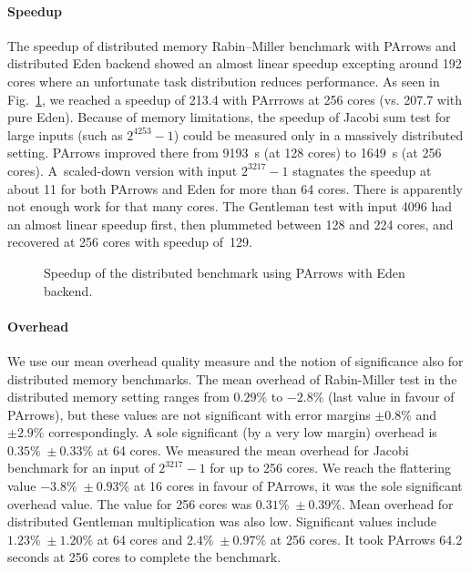 \paragraph{Speedup}
The speedup of distributed memory Rabin--Miller benchmark with PArrows and distributed Eden backend showed an almost 
linear speedup excepting around 192 cores where an unfortunate task distribution reduces performance.
As seen in Fig.~\ref{fig:rabinMillerDistSpeedup}, we reached a speedup of 213.4 with PArrrows at 256 cores (vs. 207.7 with pure Eden). Because of memory limitations, the speedup of Jacobi sum test for large inputs (such as $2^{4253}-1$) could be measured only in a massively distributed setting. PArrows improved there from \SI{9193}{\second} (at 128 cores) to \SI{1649}{\second} (at 256 cores). A~scaled-down version with input $2^{3217}-1$ stagnates the speedup at about 11 for both PArrows and Eden for more than 64 cores. There is apparently not enough work for that many cores. The Gentleman test with input 4096 had an almost linear speedup first, then plummeted between 128 and 224 cores, and recovered at 256 cores with speedup of~129.

\begin{figure}[ht]
	\centering
	\caption[Speedup distributed Rabin--Miller]{Speedup of the distributed \rmtest benchmark using PArrows with Eden backend.}
	\label{fig:rabinMillerDistSpeedup}
\end{figure}

\paragraph{Overhead}
We use our mean overhead quality measure and the notion of significance also for distributed memory benchmarks. The mean overhead of Rabin-Miller test in the distributed memory setting ranges from $0.29\%$ to $-2.8\%$ (last value in favour of PArrows), but these values are not significant with error margins $\pm 0.8\%$ and $\pm 2.9\%$ correspondingly. A sole significant (by a very low margin) overhead is $0.35\% \; \pm 0.33\%$ at 64 cores.
We measured the mean overhead for Jacobi benchmark for an input of $2^{3217}-1$ for up to 256 cores.
We reach the flattering value $-3.8\% \; \pm 0.93\%$ at 16 cores in favour of PArrows, it was the sole significant overhead value. The  value for 256 cores was $0.31\% \; \pm 0.39\%$.
Mean overhead for distributed Gentleman multiplication was also low. Significant values include $1.23\% \; \pm 1.20\%$ at 64 cores and $2.4\% \; \pm 0.97\%$ at 256 cores. It took PArrows 64.2 seconds at 256 cores to complete the benchmark.

